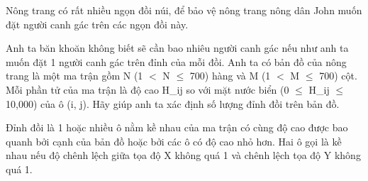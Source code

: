 Nông trang có rất nhiều ngọn đồi núi, để bảo vệ nông trang nông dân John muốn đặt người canh gác trên các ngọn đồi này.  

   Anh ta băn khoăn không biết sẽ cần bao nhiêu người canh gác nếu như anh ta muốn đặt 1 người canh gác trên đỉnh của mỗi đồi. Anh ta có bản đồ của nông trang là một ma trận gồm N (1 $<$ N  $\le$  700) hàng và M (1 $<$ M  $\le$  700) cột. Mỗi phần tử của ma trận là độ cao H\_ij so với mặt nước biển (0  $\le$  H\_ij  $\le$  10,000) của ô (i, j). Hãy giúp anh ta xác định số lượng đỉnh đồi trên bản đồ.  

   Đỉnh đồi là 1 hoặc nhiều ô nằm kề nhau của ma trận có cùng độ cao được bao quanh bởi cạnh của bản đồ hoặc bởi các ô có độ cao nhỏ hơn. Hai ô gọi là kề nhau nếu độ chênh lệch giữa tọa độ X không quá 1 và chênh lệch tọa độ Y không quá 1.  

\
